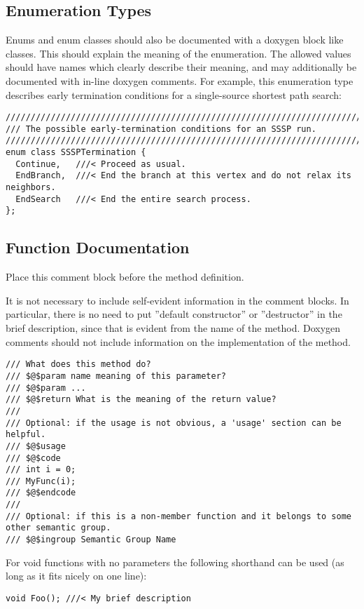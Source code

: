 \documentclass[12pt]{article}
\begin{document}
\subsection{Enumeration Types}

Enums and enum classes should also be documented with a doxygen block like
classes. This should explain the meaning of the enumeration. The allowed values
should have names which clearly describe their meaning, and may additionally be
documented with in-line doxygen comments. For example, this enumeration type
describes early termination conditions for a single-source shortest path search:

\begin{lstlisting}[mathescape]
////////////////////////////////////////////////////////////////////////////////
/// The possible early-termination conditions for an SSSP run.
////////////////////////////////////////////////////////////////////////////////
enum class SSSPTermination {
  Continue,   ///< Proceed as usual.
  EndBranch,  ///< End the branch at this vertex and do not relax its neighbors.
  EndSearch   ///< End the entire search process.
};
\end{lstlisting}

\subsection{Function Documentation}

Place this comment block before the method definition.

It is not necessary to include self-evident information in the comment blocks.
In particular, there is no need to put ”default constructor” or ”destructor” in
the brief description, since that is evident from the name of the method.
Doxygen comments should not include information on the implementation of the
method.

\begin{lstlisting}[mathescape]
/// What does this method do?
/// $@$param name meaning of this parameter?
/// $@$param ...
/// $@$return What is the meaning of the return value?
///
/// Optional: if the usage is not obvious, a 'usage' section can be helpful.
/// $@$usage
/// $@$code
/// int i = 0;
/// MyFunc(i);
/// $@$endcode
///
/// Optional: if this is a non-member function and it belongs to some other semantic group.
/// $@$ingroup Semantic Group Name
\end{lstlisting}

For void functions with no parameters the following shorthand can be used (as
long as it fits nicely on one line):
\begin{lstlisting}[mathescape]
void Foo(); ///< My brief description
\end{lstlisting}
\end{document}
